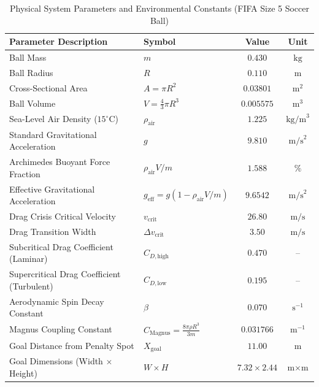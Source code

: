 \begin{table}[htbp]
\centering
\caption{Physical System Parameters and Environmental Constants (FIFA Size 5 Soccer Ball)}
\label{tab:physics_constants}
\begin{tabular}{llcc}
\toprule
\textbf{Parameter Description} & \textbf{Symbol} & \textbf{Value} & \textbf{Unit} \\
\midrule
Ball Mass & $m$ & $0.430$ & $\text{kg}$ \\
Ball Radius & $R$ & $0.110$ & $\text{m}$ \\
Cross-Sectional Area & $A = \pi R^2$ & $0.03801$ & $\text{m}^2$ \\
Ball Volume & $V = \frac{4}{3}\pi R^3$ & $0.005575$ & $\text{m}^3$ \\
Sea-Level Air Density ($15^\circ\text{C}$) & $\rho_{\text{air}}$ & $1.225$ & $\text{kg/m}^3$ \\
Standard Gravitational Acceleration & $g$ & $9.810$ & $\text{m/s}^2$ \\
Archimedes Buoyant Force Fraction & $\rho_{\text{air}} V / m$ & $1.588$ & $\%$ \\
Effective Gravitational Acceleration & $g_{\text{eff}} = g(1 - \rho_{\text{air}}V/m)$ & $9.6542$ & $\text{m/s}^2$ \\
Drag Crisis Critical Velocity & $v_{\text{crit}}$ & $26.80$ & $\text{m/s}$ \\
Drag Transition Width & $\Delta v_{\text{crit}}$ & $3.50$ & $\text{m/s}$ \\
Subcritical Drag Coefficient (Laminar) & $C_{D,\text{high}}$ & $0.470$ & -- \\
Supercritical Drag Coefficient (Turbulent) & $C_{D,\text{low}}$ & $0.195$ & -- \\
Aerodynamic Spin Decay Constant & $\beta$ & $0.070$ & $\text{s}^{-1}$ \\
Magnus Coupling Constant & $C_{\text{Magnus}} = \frac{8\pi \rho R^3}{3m}$ & $0.031766$ & $\text{m}^{-1}$ \\
Goal Distance from Penalty Spot & $X_{\text{goal}}$ & $11.00$ & $\text{m}$ \\
Goal Dimensions (Width $\times$ Height) & $W \times H$ & $7.32 \times 2.44$ & $\text{m} \times \text{m}$ \\
\bottomrule
\end{tabular}
\end{table}
